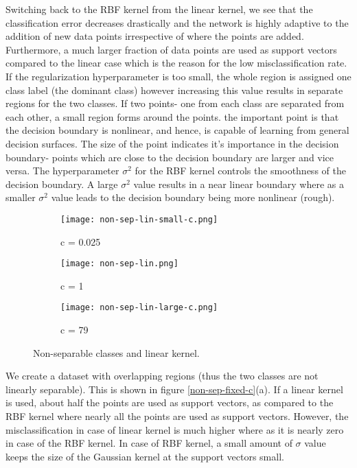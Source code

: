 \documentclass[paper=a4, fontsize=11pt]{scrartcl} %
\numberwithin{equation}{section} %
\begin{document}
Switching back to the RBF kernel from the linear kernel, we see that the classification error decreases drastically and the network is highly adaptive to the addition of new data points irrespective of where the points are added. Furthermore, a much larger fraction of data points are used as support vectors compared to the linear case which is the reason for the low misclassification rate. If the regularization hyperparameter is too small, the whole region is assigned one class label (the dominant class) however increasing this value results in separate regions for the two classes. If two points- one from each class are separated from each other, a small region forms around the points. the important point is that the decision boundary is nonlinear, and hence, is capable of learning from general decision surfaces. The size of the point indicates it's importance in the decision boundary- points which are close to the decision boundary are larger and vice versa. The hyperparameter $\sigma^2$ for the RBF kernel controls the smoothness of the decision boundary. A large $\sigma^2$ value results in a near linear boundary where as a smaller $\sigma^2$ value leads to the decision boundary being more nonlinear (rough).

\begin{figure}[ht]
\centering
\begin{subfigure}[b]{0.3\textwidth}
		\centering
		\texttt{[image: non-sep-lin-small-c.png]}
		\caption{c = 0.025}
	\end{subfigure}
	\begin{subfigure}[b]{0.3\textwidth}
		\centering
		\texttt{[image: non-sep-lin.png]}
		\caption{c = 1}
	\end{subfigure}
	\begin{subfigure}[b]{0.3\textwidth}
		\centering
		\texttt{[image: non-sep-lin-large-c.png]}
		\caption{c = 79}
	\end{subfigure}
\caption{Non-separable classes and linear kernel.}
\label{non-sep-linear}
\end{figure}

We create a dataset with overlapping regions (thus the two classes are not linearly separable). This is shown in figure \ref{non-sep-fixed-c}(a). If a linear kernel is used, about half the points are used as support vectors, as compared to the RBF kernel where nearly all the points are used as support vectors. However, the misclassification in case of linear kernel is much higher where as it is nearly zero in case of the RBF kernel. In case of RBF kernel, a small amount of $\sigma$ value keeps the size of the Gaussian kernel at the support vectors small.\\
\end{document}
